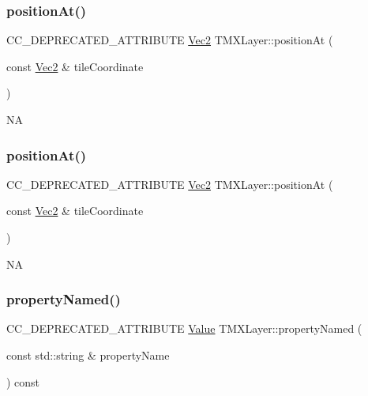 \subsubsection{\texorpdfstring{position\+At()}{positionAt()}\hspace{0.1cm}{\footnotesize\ttfamily [1/2]}}
{\footnotesize\ttfamily C\+C\+\_\+\+D\+E\+P\+R\+E\+C\+A\+T\+E\+D\+\_\+\+A\+T\+T\+R\+I\+B\+U\+TE \hyperlink{classVec2}{Vec2} T\+M\+X\+Layer\+::position\+At (\begin{DoxyParamCaption}\item[{const \hyperlink{classVec2}{Vec2} \&}]{tile\+Coordinate }\end{DoxyParamCaption})\hspace{0.3cm}{\ttfamily [inline]}}

NA \mbox{\label{classTMXLayer_aac322f83e04e9efa5cb88b49d034b9f0}} 
\subsubsection{\texorpdfstring{position\+At()}{positionAt()}\hspace{0.1cm}{\footnotesize\ttfamily [2/2]}}
{\footnotesize\ttfamily C\+C\+\_\+\+D\+E\+P\+R\+E\+C\+A\+T\+E\+D\+\_\+\+A\+T\+T\+R\+I\+B\+U\+TE \hyperlink{classVec2}{Vec2} T\+M\+X\+Layer\+::position\+At (\begin{DoxyParamCaption}\item[{const \hyperlink{classVec2}{Vec2} \&}]{tile\+Coordinate }\end{DoxyParamCaption})\hspace{0.3cm}{\ttfamily [inline]}}

NA \mbox{\label{classTMXLayer_af6fefaddaa8d6208b1d375f08e6d3ad6}} 
\subsubsection{\texorpdfstring{property\+Named()}{propertyNamed()}\hspace{0.1cm}{\footnotesize\ttfamily [1/2]}}
{\footnotesize\ttfamily C\+C\+\_\+\+D\+E\+P\+R\+E\+C\+A\+T\+E\+D\+\_\+\+A\+T\+T\+R\+I\+B\+U\+TE \hyperlink{classValue}{Value} T\+M\+X\+Layer\+::property\+Named (\begin{DoxyParamCaption}\item[{const std\+::string \&}]{property\+Name }\end{DoxyParamCaption}) const\hspace{0.3cm}{\ttfamily [inline]}}

